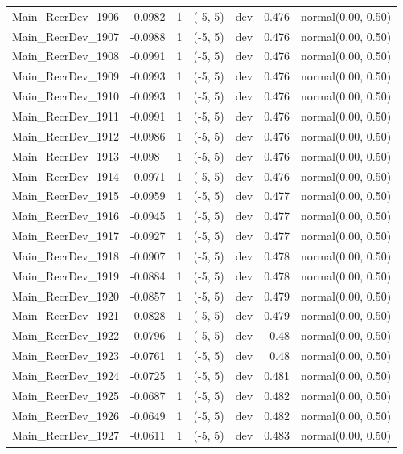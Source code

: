 \documentclass[
]{scrartcl}
\begin{document}
\begin{longtable}{llrllrl}
Main\_RecrDev\_1906 & -0.0982 & 1 & (-5, 5) & dev & 0.476 & normal(0.00, 0.50) \\ 
Main\_RecrDev\_1907 & -0.0988 & 1 & (-5, 5) & dev & 0.476 & normal(0.00, 0.50) \\ 
Main\_RecrDev\_1908 & -0.0991 & 1 & (-5, 5) & dev & 0.476 & normal(0.00, 0.50) \\ 
Main\_RecrDev\_1909 & -0.0993 & 1 & (-5, 5) & dev & 0.476 & normal(0.00, 0.50) \\ 
Main\_RecrDev\_1910 & -0.0993 & 1 & (-5, 5) & dev & 0.476 & normal(0.00, 0.50) \\ 
Main\_RecrDev\_1911 & -0.0991 & 1 & (-5, 5) & dev & 0.476 & normal(0.00, 0.50) \\ 
Main\_RecrDev\_1912 & -0.0986 & 1 & (-5, 5) & dev & 0.476 & normal(0.00, 0.50) \\ 
Main\_RecrDev\_1913 & -0.098 & 1 & (-5, 5) & dev & 0.476 & normal(0.00, 0.50) \\ 
Main\_RecrDev\_1914 & -0.0971 & 1 & (-5, 5) & dev & 0.476 & normal(0.00, 0.50) \\ 
Main\_RecrDev\_1915 & -0.0959 & 1 & (-5, 5) & dev & 0.477 & normal(0.00, 0.50) \\ 
Main\_RecrDev\_1916 & -0.0945 & 1 & (-5, 5) & dev & 0.477 & normal(0.00, 0.50) \\ 
Main\_RecrDev\_1917 & -0.0927 & 1 & (-5, 5) & dev & 0.477 & normal(0.00, 0.50) \\ 
Main\_RecrDev\_1918 & -0.0907 & 1 & (-5, 5) & dev & 0.478 & normal(0.00, 0.50) \\ 
Main\_RecrDev\_1919 & -0.0884 & 1 & (-5, 5) & dev & 0.478 & normal(0.00, 0.50) \\ 
Main\_RecrDev\_1920 & -0.0857 & 1 & (-5, 5) & dev & 0.479 & normal(0.00, 0.50) \\ 
Main\_RecrDev\_1921 & -0.0828 & 1 & (-5, 5) & dev & 0.479 & normal(0.00, 0.50) \\ 
Main\_RecrDev\_1922 & -0.0796 & 1 & (-5, 5) & dev & 0.48 & normal(0.00, 0.50) \\ 
Main\_RecrDev\_1923 & -0.0761 & 1 & (-5, 5) & dev & 0.48 & normal(0.00, 0.50) \\ 
Main\_RecrDev\_1924 & -0.0725 & 1 & (-5, 5) & dev & 0.481 & normal(0.00, 0.50) \\ 
Main\_RecrDev\_1925 & -0.0687 & 1 & (-5, 5) & dev & 0.482 & normal(0.00, 0.50) \\ 
Main\_RecrDev\_1926 & -0.0649 & 1 & (-5, 5) & dev & 0.482 & normal(0.00, 0.50) \\ 
Main\_RecrDev\_1927 & -0.0611 & 1 & (-5, 5) & dev & 0.483 & normal(0.00, 0.50) \\ 

\end{longtable}
\end{document}
